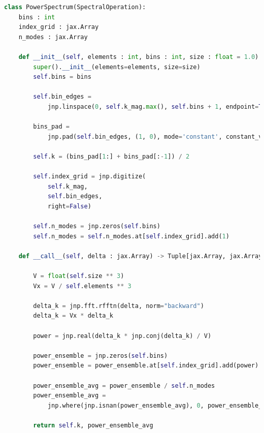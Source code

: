 \documentclass{article}
\begin{document}
\begin{lstlisting}[language=Python]
class PowerSpectrum(SpectralOperation):
    bins : int
    index_grid : jax.Array
    n_modes : jax.Array

    def __init__(self, elements : int, bins : int, size : float = 1.0):
        super().__init__(elements=elements, size=size)
        self.bins = bins

        self.bin_edges = 
            jnp.linspace(0, self.k_mag.max(), self.bins + 1, endpoint=True)[1:]

        bins_pad = 
            jnp.pad(self.bin_edges, (1, 0), mode='constant', constant_values=0)
            
        self.k = (bins_pad[1:] + bins_pad[:-1]) / 2

        self.index_grid = jnp.digitize(
            self.k_mag, 
            self.bin_edges,
            right=False)

        self.n_modes = jnp.zeros(self.bins)
        self.n_modes = self.n_modes.at[self.index_grid].add(1)

    def __call__(self, delta : jax.Array) -> Tuple[jax.Array, jax.Array]:

        V = float(self.size ** 3)
        Vx = V / self.elements ** 3

        delta_k = jnp.fft.rfftn(delta, norm="backward")  
        delta_k = Vx * delta_k

        power = jnp.real(delta_k * jnp.conj(delta_k) / V)

        power_ensemble = jnp.zeros(self.bins)
        power_ensemble = power_ensemble.at[self.index_grid].add(power)

        power_ensemble_avg = power_ensemble / self.n_modes
        power_ensemble_avg =      
            jnp.where(jnp.isnan(power_ensemble_avg), 0, power_ensemble_avg)
    
        return self.k, power_ensemble_avg
\end{lstlisting}
\end{document}
